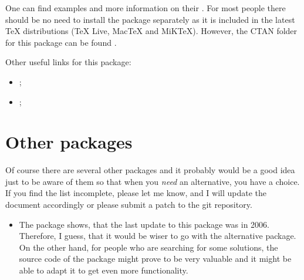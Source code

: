 \documentclass[
]{scrartcl}
\begin{document}
%
One can find examples and more information on their
    .
%
For most people there should be no need to install the 
    package separately as it is included in the latest \TeX{} distributions
    (\TeX{} Live, Mac\TeX{} and MiK\TeX{}).
%
However, the CTAN folder for this package can be found
    .

%
Other useful links for this package:
\begin{itemize}
    \item {};
    \item {};
\end{itemize}

\section{Other packages}

%
Of course there are several other packages and it probably would be a good idea
    just to be aware of them so that when you \emph{need} an alternative, you
    have a choice.
%
If you find the list incomplete, please let me know, and I will update the
    document accordingly or please submit a patch to the git repository.

\begin{itemize}
    \item 
        The  package
             shows, that the last update to this package was in 2006.
        Therefore, I guess, that it would be wiser to go with the alternative
             package.
        On the other hand, for people who are searching for some solutions, the
            source code of the package might prove to be very valuable and it
            might be able to adapt it to get even more functionality.
\end{itemize}
\end{document}
